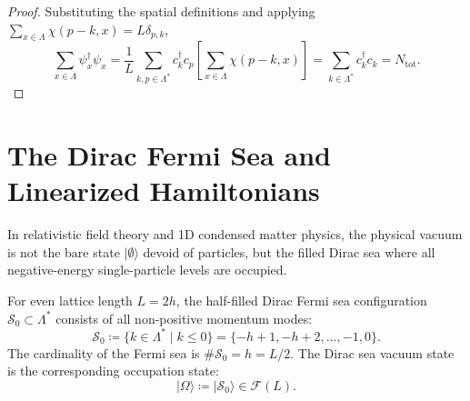 \begin{proof}
Substituting the spatial definitions and applying $\sum_{x\in\Lambda}\chi(p-k,x)=L\delta_{p,k}$,
\begin{equation}
\sum_{x\in\Lambda}\psi_x^\dagger\psi_x
=\frac1L\sum_{k,p\in\Lambda^*}c_k^\dagger c_p\left[\sum_{x\in\Lambda}\chi(p-k,x)\right]
=\sum_{k\in\Lambda^*}c_k^\dagger c_k=N_{\mathrm{tot}}.
\end{equation}
\end{proof}

\section{The Dirac Fermi Sea and Linearized Hamiltonians}

In relativistic field theory and 1D condensed matter physics, the physical vacuum is not the bare state $|\emptyset\rangle$ devoid of particles, but the filled Dirac sea where all negative-energy single-particle levels are occupied.

\begin{definition}
For even lattice length $L = 2h$, the half-filled Dirac Fermi sea configuration $\mathcal{S}_0 \subset \Lambda^*$ consists of all non-positive momentum modes:
\begin{equation}
\mathcal{S}_0 \coloneqq \{k \in \Lambda^* \mid k \le 0\} = \{-h+1, -h+2, \dots, -1, 0\}.
\end{equation}
The cardinality of the Fermi sea is $\#\mathcal{S}_0 = h = L/2$. The Dirac sea vacuum state is the corresponding occupation state:
\begin{equation}
|\Omega\rangle \coloneqq |\mathcal{S}_0\rangle \in \mathcal{F}(L).
\end{equation}
\end{definition}

